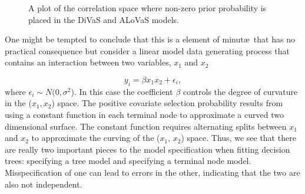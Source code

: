\begin{figure}[H]
\begin{center}
\end{center}
\caption{A plot of the correlation space where non-zero prior probability is placed in the DiVaS and ALoVaS models.}
\label{fig:corr_divas_alovas}
\end{figure}



One might be tempted to conclude that this is a element of minut\ae\ that has no practical consequence but consider a linear model data generating process that contains an interaction between two variables, $x_1$ and $x_2$

\begin{equation}\label{eqn:interaction_model}
y_i = \beta x_1x_2 + \epsilon_i,
\end{equation}  
where $\epsilon_i \sim N(0, \sigma^2$). In this case the coefficient $\beta$ controls the degree of curvature in the ($x_1, x_2$) space. The positive covariate selection probability results from using a constant function in each terminal node to approximate a curved two dimensional surface. The constant function requires alternating splits between $x_1$ and $x_2$ to approximate the curving of the ($x_1$, $x_2$) space. Thus, we see that there are really two important pieces to the model specification when fitting decision trees: specifying a tree model and specifying a terminal node model. Misspecification of one can lead to errors in the other, indicating that the two are also not independent.

